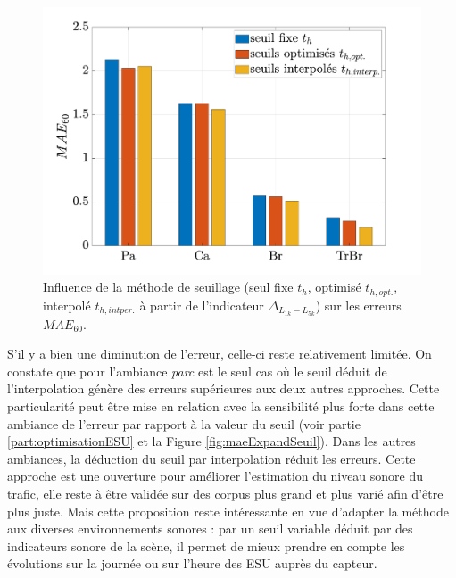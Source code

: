 \begin{figure}[h]
\centering
\includegraphics[width=.7\linewidth]{./figures/resultats/erreursSeuilOpt.pdf}
\caption{Influence de la méthode de seuillage (seul fixe $t_h$, optimisé $t_{h,opt.}$, interpolé $t_{h,intper.}$ à partir de l'indicateur $\Delta_{L_{1k}-L_{5k}}$) sur les erreurs $MAE_{60}$.}
\label{fig:erreurInterp}
\end{figure}

S'il y a bien une diminution de l'erreur, celle-ci reste relativement limitée. On constate que pour l'ambiance \textit{parc} est le seul cas où le seuil déduit de l'interpolation génère des erreurs supérieures aux deux autres approches. Cette particularité peut être mise en relation avec la sensibilité plus forte dans cette ambiance de l'erreur par rapport à la valeur du seuil (voir partie \ref{part:optimisationESU} et la Figure \ref{fig:maeExpandSeuil}). Dans les autres ambiances, la déduction du seuil par interpolation réduit les erreurs. 
Cette approche est une ouverture pour améliorer l'estimation du niveau sonore du trafic, elle reste à être validée sur des corpus plus grand et plus varié afin d'être plus juste. 
Mais cette proposition reste intéressante en vue d'adapter la méthode aux diverses environnements sonores : par un seuil variable déduit par des indicateurs sonore de la scène, il permet de mieux prendre en compte les évolutions sur la journée ou sur l'heure des ESU auprès du capteur.